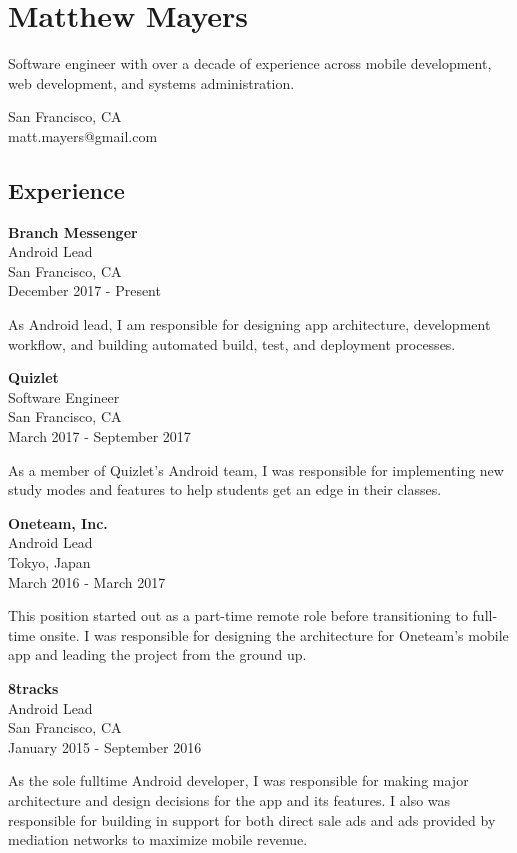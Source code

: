 \documentclass[]{article}
\date{}
\begin{document}
\section{Matthew Mayers}\label{matthew-mayers}

Software engineer with over a decade of experience across mobile
development, web development, and systems administration.

San Francisco, CA\\
matt.mayers@gmail.com

\subsection{Experience}\label{experience}

\textbf{Branch Messenger}\\
Android Lead\\
San Francisco, CA\\
December 2017 - Present

As Android lead, I am responsible for designing app architecture,
development workflow, and building automated build, test, and deployment
processes.

\textbf{Quizlet}\\
Software Engineer\\
San Francisco, CA\\
March 2017 - September 2017

As a member of Quizlet's Android team, I was responsible for
implementing new study modes and features to help students get an edge
in their classes.

\textbf{Oneteam, Inc.}\\
Android Lead\\
Tokyo, Japan\\
March 2016 - March 2017

This position started out as a part-time remote role before
transitioning to full-time onsite. I was responsible for designing the
architecture for Oneteam's mobile app and leading the project from the
ground up.

\textbf{8tracks}\\
Android Lead\\
San Francisco, CA\\
January 2015 - September 2016

As the sole fulltime Android developer, I was responsible for making
major architecture and design decisions for the app and its features. I
also was responsible for building in support for both direct sale ads
and ads provided by mediation networks to maximize mobile revenue.
\end{document}
